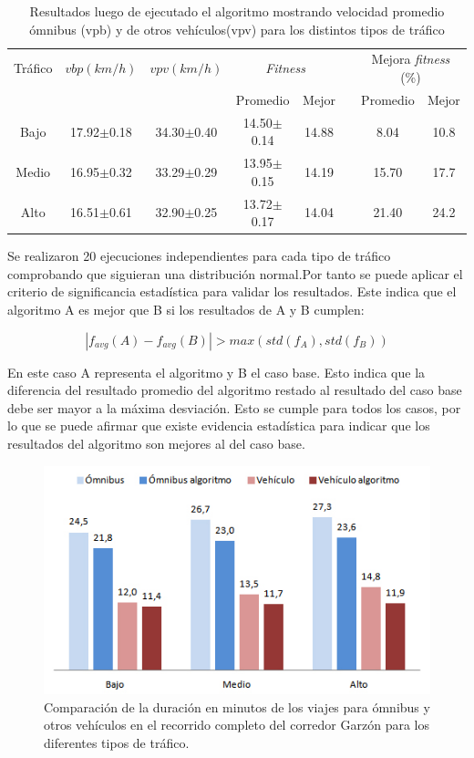 \begin{table}[H]
	\renewcommand{\arraystretch}{1.2}	
		\centering
	\caption{Resultados luego de ejecutado el algoritmo mostrando velocidad promedio ómnibus (vpb) y  de otros vehículos(vpv) para los distintos tipos de tráfico }
	\label{table:resultado_caso_algoritmo}
	\begin{tabular}{cccccccc}
		\hline 
		Tráfico& 
		$vbp(km/h)$& 
		$vpv(km/h)$&
		\multicolumn{2}{c}{\emph{Fitness}}&  & 
		\multicolumn{2}{c}{Mejora \emph{fitness} (\%)}\\  \cline{4-5} \cline{7-8}&     &     & \multicolumn{1}{c}{Promedio} & \multicolumn{1}{c}{Mejor} &  & \multicolumn{1}{c}{Promedio} & \multicolumn{1}{c}{Mejor} \\ \hline
		Bajo & 17.92$\pm$0.18 & 34.30$\pm$0.40 & 14.50$\pm$0.14 & 14.88 & & 8.04 & 10.8  \\
		Medio& 16.95$\pm$0.32 & 33.29$\pm$0.29 & 13.95$\pm$0.15 & 14.19 & & 15.70& 17.7\\ 
		Alto & 16.51$\pm$0.61  & 32.90$\pm$0.25& 13.72$\pm$0.17 & 14.04 & & 21.40& 24.2\\	
		\hline	    
	\end{tabular}
\end{table}

Se realizaron 20 ejecuciones independientes para cada tipo de tráfico comprobando que siguieran una distribución normal.Por tanto se puede aplicar el criterio de significancia estadística para validar los resultados. Este indica que el
algoritmo A es mejor que B si los resultados de A y B cumplen:

\begin{equation}
\label{eq:funcion_significancia}
\left |f_{avg}(A) - f_{avg}(B)  \right | > max(std(f_A),std(f_B))
\end{equation}

En este caso A representa el algoritmo y B el caso base. Esto indica que la diferencia del resultado promedio del algoritmo restado al resultado del caso base debe ser mayor a la máxima desviación. Esto se cumple para todos los casos, por lo que se puede afirmar  que existe evidencia estadística para indicar que los resultados del algoritmo son mejores al del caso base.

\begin{figure}[H]
	\centering
	\includegraphics[width=0.8\linewidth]{Figures/duracion_viajes}
	\caption{Comparación de la duración en minutos de los viajes para ómnibus y otros vehículos en el recorrido completo del corredor Garzón para los diferentes tipos de tráfico.}
	\label{fig:duracion_viajes}
\end{figure}

